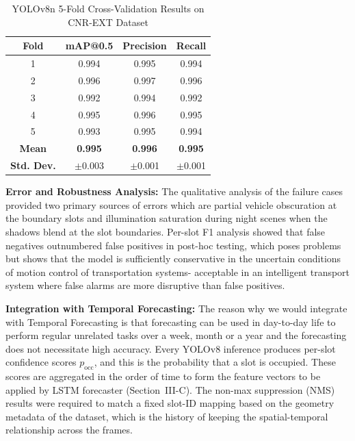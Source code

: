 \documentclass[conference]{IEEEtran}
\begin{document}
\begin{table}[htbp]
\caption{YOLOv8n 5-Fold Cross-Validation Results on CNR-EXT Dataset}
\begin{center}
\begin{tabular}{|c|c|c|c|}
\hline
\textbf{Fold} & \textbf{mAP@0.5} & \textbf{Precision} & \textbf{Recall} \\
\hline
1 & 0.994 & 0.995 & 0.994 \\
2 & 0.996 & 0.997 & 0.996 \\
3 & 0.992 & 0.994 & 0.992 \\
4 & 0.995 & 0.996 & 0.995 \\
5 & 0.993 & 0.995 & 0.994 \\
\hline
\textbf{Mean} & \textbf{0.995} & \textbf{0.996} & \textbf{0.995} \\
\textbf{Std. Dev.} & $\pm$0.003 & $\pm$0.001 & $\pm$0.001 \\
\hline
\end{tabular}
\label{tab:cvresults}
\end{center}
\end{table}

\vspace{0.3em}
\noindent\textbf{Error and Robustness Analysis:}
The qualitative analysis of the failure cases provided two primary sources of errors which are partial vehicle obscuration at the boundary slots and illumination saturation during night scenes when the shadows blend at the slot boundaries. Per-slot F1 analysis showed that false negatives outnumbered false positives in post-hoc testing, which poses problems but shows that the model is sufficiently conservative in the uncertain conditions of motion control of transportation systems- acceptable in an intelligent transport system where false alarms are more disruptive than false positives.

\vspace{0.3em}
\noindent\textbf{Integration with Temporal Forecasting:}
The reason why we would integrate with Temporal Forecasting is that forecasting can be used in day-to-day life to perform regular unrelated tasks over a week, month or a year and the forecasting does not necessitate high accuracy.
Every YOLOv8 inference produces per-slot confidence scores $p_{\text{occ}}$, and this is the probability that a slot is occupied. These scores are aggregated in the order of time to form the feature vectors to be applied by LSTM forecaster (Section~III-C). The non-max suppression (NMS) results were required to match a fixed slot-ID mapping based on the geometry metadata of the dataset, which is the history of keeping the spatial-temporal relationship across the frames.
\end{document}
